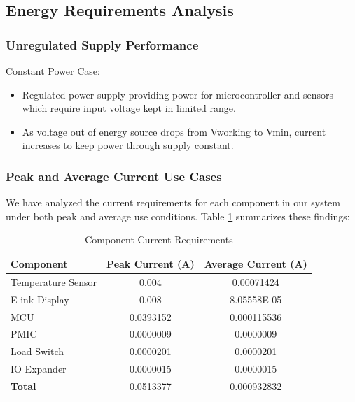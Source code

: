 \documentclass[a4paper,11pt]{article}%
\begin{document}
\subsection{Energy Requirements Analysis}
\subsubsection{Unregulated Supply Performance}
Constant Power Case:
\begin{itemize}
\item Regulated power supply providing power for microcontroller and sensors which require input voltage kept in limited range.
\item As voltage out of energy source drops from Vworking to Vmin, current increases to keep power through supply constant.
\end{itemize}
\subsubsection{Peak and Average Current Use Cases}
We have analyzed the current requirements for each component in our system under both peak and average use conditions. Table \ref{tab:current_requirements} summarizes these findings:
\begin{table}[H]
\centering
\begin{tabular}{|l|c|c|}
\hline
\textbf{Component} & \textbf{Peak Current (A)} & \textbf{Average Current (A)} \\
\hline
Temperature Sensor & 0.004 & 0.00071424 \\
\hline
E-ink Display & 0.008 & 8.05558E-05 \\
\hline
MCU & 0.0393152 & 0.000115536 \\
\hline
PMIC & 0.0000009 & 0.0000009 \\
\hline
Load Switch & 0.0000201 & 0.0000201 \\
\hline
IO Expander & 0.0000015 & 0.0000015 \\
\hline
\textbf{Total} & 0.0513377 & 0.000932832 \\
\hline
\end{tabular}
\caption{Component Current Requirements}
\label{tab:current_requirements}
\end{table}
\end{document}
